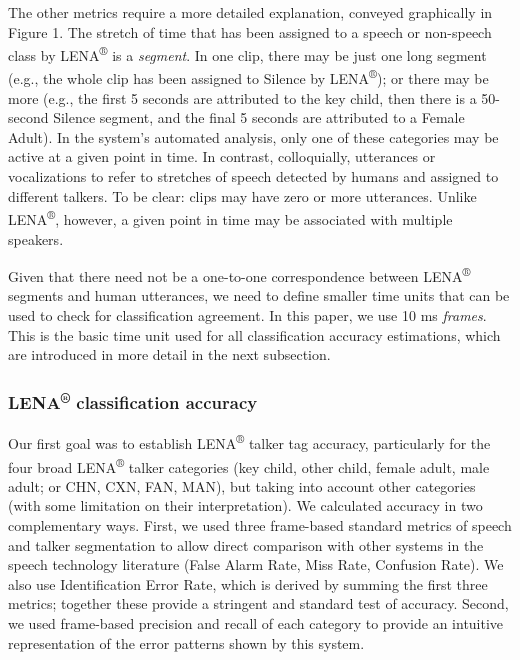 \documentclass[english,table,man,floatsintext]{apa6}
\begin{document}
The other metrics require a more detailed explanation, conveyed graphically in Figure 1. The stretch of time that has been assigned to a speech or non-speech class by LENA\textsuperscript{®} is a \emph{segment}. In one clip, there may be just one long segment (e.g., the whole clip has been assigned to Silence by LENA\textsuperscript{®}); or there may be more (e.g., the first 5 seconds are attributed to the key child, then there is a 50-second Silence segment, and the final 5 seconds are attributed to a Female Adult). In the system's automated analysis, only one of these categories may be active at a given point in time. In contrast, colloquially, utterances or vocalizations to refer to stretches of speech detected by humans and assigned to different talkers. To be clear: clips may have zero or more utterances. Unlike LENA\textsuperscript{®}, however, a given point in time may be associated with multiple speakers.

Given that there need not be a one-to-one correspondence between LENA\textsuperscript{®} segments and human utterances, we need to define smaller time units that can be used to check for classification agreement. In this paper, we use 10 ms \emph{frames}. This is the basic time unit used for all classification accuracy estimations, which are introduced in more detail in the next subsection.

\hypertarget{lena-classification-accuracy}{%
\subsubsection{\texorpdfstring{LENA\textsuperscript{®} classification accuracy}{LENA® classification accuracy}}\label{lena-classification-accuracy}}

Our first goal was to establish LENA\textsuperscript{®} talker tag accuracy, particularly for the four broad LENA\textsuperscript{®} talker categories (key child, other child, female adult, male adult; or CHN, CXN, FAN, MAN), but taking into account other categories (with some limitation on their interpretation). We calculated accuracy in two complementary ways. First, we used three frame-based standard metrics of speech and talker segmentation to allow direct comparison with other systems in the speech technology literature (False Alarm Rate, Miss Rate, Confusion Rate). We also use Identification Error Rate, which is derived by summing the first three metrics; together these provide a stringent and standard test of accuracy. Second, we used frame-based precision and recall of each category to provide an intuitive representation of the error patterns shown by this system.
\end{document}
